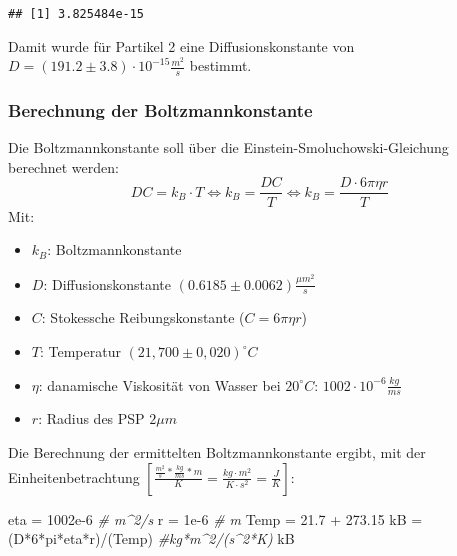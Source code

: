 \documentclass[class=article, crop=false]{standalone}
\newenvironment{Shaded}{\begin{snugshade}}{\end{snugshade}}
\newcommand{\CommentTok}[1]{\textcolor[rgb]{0.56,0.35,0.01}{\textit{#1}}}
\newcommand{\DecValTok}[1]{\textcolor[rgb]{0.00,0.00,0.81}{#1}}
\newcommand{\FloatTok}[1]{\textcolor[rgb]{0.00,0.00,0.81}{#1}}
\newcommand{\NormalTok}[1]{#1}
\newcommand{\OtherTok}[1]{\textcolor[rgb]{0.56,0.35,0.01}{#1}}
\newcommand{\SpecialCharTok}[1]{\textcolor[rgb]{0.00,0.00,0.00}{#1}}
\begin{document}
\begin{verbatim}
## [1] 3.825484e-15
\end{verbatim}

Damit wurde für Partikel 2 eine Diffusionskonstante von
\(D=(191.2 \pm 3.8)\cdot 10^{-15} \frac{m^2}{s}\) bestimmt.

\hypertarget{berechnung-der-boltzmannkonstante}{%
\subsubsection{Berechnung der
Boltzmannkonstante}\label{berechnung-der-boltzmannkonstante}}

Die Boltzmannkonstante soll über die Einstein-Smoluchowski-Gleichung
berechnet werden:
\[DC = k_B\cdot T \Leftrightarrow k_B = \frac{DC}{T} \Leftrightarrow k_B = \frac{D\cdot 6\pi \eta r}{T}\]
Mit:

\begin{itemize}
  \item $k_B$: Boltzmannkonstante
  \item $D$: Diffusionskonstante $(0.6185 \pm 0.0062 )\frac{\mu m^2}{s}$
  \item $C$: Stokessche Reibungskonstante ($C=6\pi \eta r$)
  \item $T$: Temperatur $(21,700 \pm 0,020)^{\circ}C$
  \item $\eta$: danamische Viskosität von Wasser bei $20^{\circ}C$: $1002\cdot 10^{-6} \frac{kg}{ms}$
  \item $r$: Radius des PSP $2\mu m$
\end{itemize}

Die Berechnung der ermittelten Boltzmannkonstante ergibt, mit der
Einheitenbetrachtung
\([\frac{\frac{m^2}{s}*\frac{kg}{ms}*m}{K} = \frac{kg\cdot m^2}{K\cdot s^2}= \frac{J}{K}]\):

\begin{Shaded}
\begin{Highlighting}[]
\NormalTok{eta }\OtherTok{=} \FloatTok{1002e{-}6} \CommentTok{\# m\^{}2/s}
\NormalTok{r }\OtherTok{=} \FloatTok{1e{-}6} \CommentTok{\# m }
\NormalTok{Temp }\OtherTok{=} \FloatTok{21.7} \SpecialCharTok{+} \FloatTok{273.15}
\NormalTok{kB }\OtherTok{=}\NormalTok{ (D}\SpecialCharTok{*}\DecValTok{6}\SpecialCharTok{*}\NormalTok{pi}\SpecialCharTok{*}\NormalTok{eta}\SpecialCharTok{*}\NormalTok{r)}\SpecialCharTok{/}\NormalTok{(Temp) }\CommentTok{\#kg*m\^{}2/(s\^{}2*K)}
\NormalTok{kB}
\end{Highlighting}
\end{Shaded}
\end{document}
